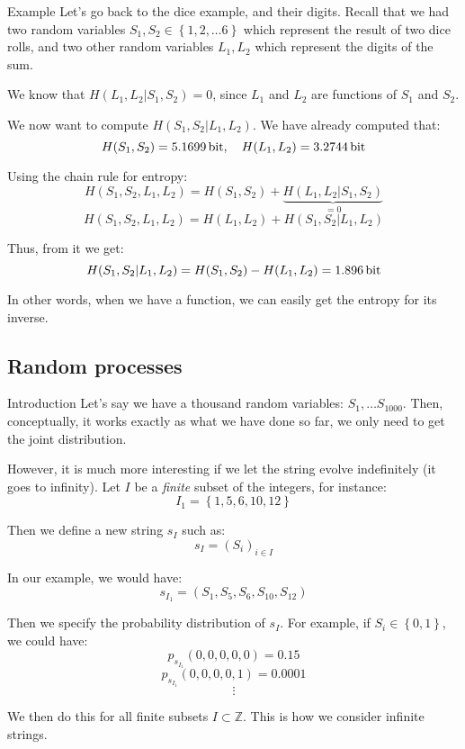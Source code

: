 \documentclass[a4paper]{article}
\begin{document}
\begin{parag}{Example}
    Let's go back to the dice example, and their digits. Recall that we had two random variables $S_1, S_2 \in \left\{1, 2, \ldots 6\right\}$ which represent the result of two dice rolls, and two other random variables $L_1, L_2$ which represent the digits of the sum.

    We know that $H\left(L_1, L_2 | S_1, S_2\right) = 0$, since $L_1$ and $L_2$ are functions of $S_1$ and $S_2$.

    We now want to compute $H\left(S_1, S_2 | L_1, L_2\right)$. We have already computed that: 
    \[H\left(S_1, S_2\right) = \SI{5.1699}{\bit}, \mathspace H\left(L_1, L_2\right) = \SI{3.2744}{\bit}\]
    
    Using the chain rule for entropy:
    \[H\left(S_1, S_2, L_1, L_2\right) = H\left(S_1, S_2\right) + \underbrace{H\left(L_1, L_2 | S_1, S_2\right)}_{= 0}\]
    \[H\left(S_1, S_2, L_1, L_2\right) = H\left(L_1, L_2\right) + H\left(S_1, S_2 | L_1, L_2\right)\]
    
    Thus, from it we get: 
    \[H\left(S_1, S_2 | L_1, L_2\right) = H\left(S_1, S_2\right) - H\left(L_1, L_2\right) = \SI{1.896}{\bit}\]
    
    In other words, when we have a function, we can easily get the entropy for its inverse.
\end{parag}

\subsection{Random processes}
\begin{parag}{Introduction}
    Let's say we have a thousand random variables: $S_1, \ldots S_{1000}$. Then, conceptually, it works exactly as what we have done so far, we only need to get the joint distribution.

    However, it is much more interesting if we let the string evolve indefinitely (it goes to infinity). Let $I$ be a \textit{finite} subset of the integers, for instance: 
    \[I_{1} = \left\{1, 5, 6, 10, 12\right\}\]
    
    Then we define a new string $s_I$ such as: 
    \[s_I = \left(S_i\right)_{i \in I}\]
    
    In our example, we would have:  
    \[s_{I_1} = \left(S_1, S_5, S_6, S_{10}, S_{12}\right)\]
    
    Then we specify the probability distribution of $s_I$. For example, if $S_i \in \left\{0, 1\right\}$, we could have: 
    \[p_{s_{I_1}}\left(0, 0, 0, 0, 0\right) = 0.15\]
    \[p_{s_{I_1}}\left(0, 0, 0, 0, 1\right) = 0.0001\]
    \[\vdots\]

    We then do this for all finite subsets $I \subset \mathbb{Z}$. This is how we consider infinite strings.
\end{parag}
\end{document}
